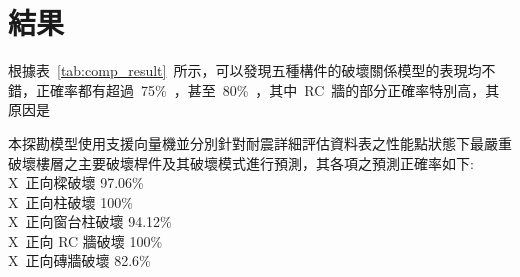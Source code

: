 \section{結果}

根據表~\ref{tab:comp_result}~所示，可以發現五種構件的破壞關係模型的表現均不錯，正確率都有超過~75\%~，甚至~80\%~，其中~RC~牆的部分正確率特別高，其原因是

本探勘模型使用支援向量機並分別針對耐震詳細評估資料表之性能點狀態下最嚴重破壞樓層之主要破壞桿件及其破壞模式進行預測，其各項之預測正確率如下: \\ \indent
X~正向樑破壞 97.06\% \\ \indent
X~正向柱破壞 100\% \\ \indent
X~正向窗台柱破壞 94.12\% \\ \indent
X~正向 RC 牆破壞 100\% \\ \indent
X~正向磚牆破壞 82.6\% \\ \indent


